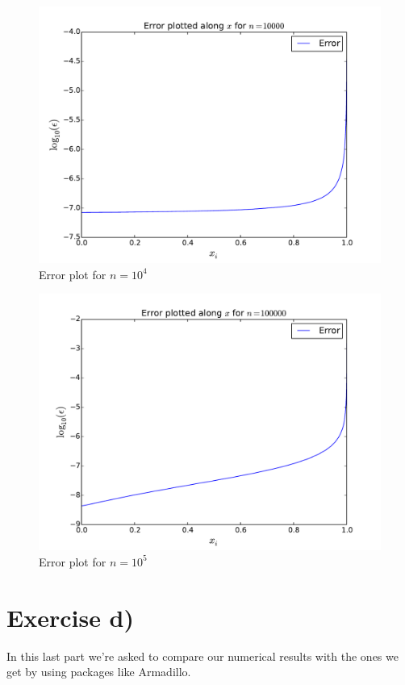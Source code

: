 \documentclass[english, 11pt]{article}
\begin{document}
\begin{figure}[H]
    \centering
    \includegraphics[width = .9\textwidth]{error_n_10000.pdf}
    \caption{Error plot for $n=10^4$}
    \label{fig:en104}
\end{figure}

\begin{figure}[H]
    \centering
    \includegraphics[width = .9\textwidth]{error_n_100000.pdf}
    \caption{Error plot for $n=10^5$}
    \label{fig:en105}
\end{figure}

\section*{Exercise d)} In this last part we're asked to compare our numerical results with the ones we get by using packages like Armadillo.
\end{document}
